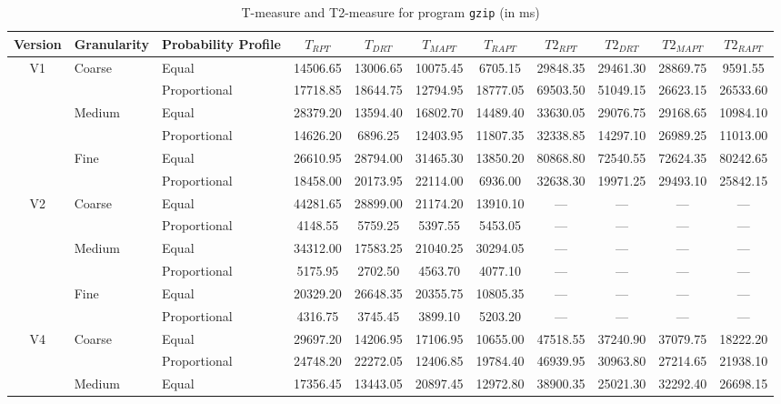 \documentclass[10pt,journal,compsoc]{IEEEtran}
\begin{document}
\begin{table}
\caption{T-measure and T2-measure for program \texttt{gzip} (in ms)}
\label{tab:Tgzip}
\centering
\begin{tabular}{|c|l|l|c|c|c|c|c|c|c|c|} \hline
Version	& Granularity	& Probability Profile	& $T_{RPT}$	& $T_{DRT}$	& $T_{MAPT}$	& $T_{RAPT}$	& $T2_{RPT}$	& $T2_{DRT}$	& $T2_{MAPT}$	 & $T2_{RAPT}$	\\ \hline
V1	& Coarse	& Equal	& 14506.65	& 13006.65	& 10075.45	& 6705.15	& 29848.35	& 29461.30	& 28869.75	& 9591.55	 \\ \cline{3-11}
	& 	& Proportional	& 17718.85	& 18644.75	& 12794.95	& 18777.05	& 69503.50	& 51049.15	& 26623.15	& 26533.60	 \\ \cline{2-11}
	& Medium	& Equal	& 28379.20	& 13594.40	& 16802.70	& 14489.40	& 33630.05	& 29076.75	& 29168.65	& 10984.10	 \\ \cline{3-11}
	& 	& Proportional	& 14626.20	& 6896.25	& 12403.95	& 11807.35	& 32338.85	& 14297.10	& 26989.25	& 11013.00	 \\ \cline{2-11}
	& Fine	& Equal	& 26610.95	& 28794.00	& 31465.30	& 13850.20	& 80868.80	& 72540.55	& 72624.35	& 80242.65	 \\ \cline{3-11}
	& 	& Proportional	& 18458.00	& 20173.95	& 22114.00	& 6936.00	& 32638.30	& 19971.25	& 29493.10	& 25842.15	 \\ \hline
V2	& Coarse	& Equal	& 44281.65	& 28899.00	& 21174.20	& 13910.10	& ---	& ---	& ---	& ---	 \\ \cline{3-11}
	& 	& Proportional	& 4148.55	& 5759.25	& 5397.55	& 5453.05	& ---	& ---	& ---	& ---	 \\ \cline{2-11}
	& Medium	& Equal	& 34312.00	& 17583.25	& 21040.25	& 30294.05	& ---	& ---	& ---	& ---	 \\ \cline{3-11}
	& 	& Proportional	& 5175.95	& 2702.50	& 4563.70	& 4077.10	& ---	& ---	& ---	& ---	 \\ \cline{2-11}
	& Fine	& Equal	& 20329.20	& 26648.35	& 20355.75	& 10805.35	& ---	& ---	& ---	& ---	 \\ \cline{3-11}
	& 	& Proportional	& 4316.75	& 3745.45	& 3899.10	& 5203.20	& ---	& ---	& ---	& ---	 \\ \hline
V4	& Coarse	& Equal	& 29697.20	& 14206.95	& 17106.95	& 10655.00	& 47518.55	& 37240.90	& 37079.75	& 18222.20	 \\ \cline{3-11}
	& 	& Proportional	& 24748.20	& 22272.05	& 12406.85	& 19784.40	& 46939.95	& 30963.80	& 27214.65	& 21938.10	 \\ \cline{2-11}
	& Medium	& Equal	& 17356.45	& 13443.05	& 20897.45	& 12972.80	& 38900.35	& 25021.30	& 32292.40	& 26698.15	 \\ \cline{3-11}

\end{tabular}
\end{table}
\end{document}
